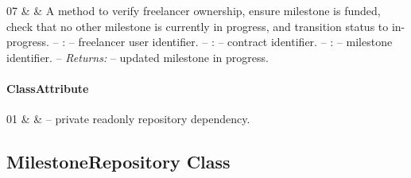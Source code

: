 \begin{ClassMethodTable}
07 & \newline{}\newline{} &
A method to verify freelancer ownership, ensure milestone is funded, check that no other milestone is currently in progress, and transition status to in-progress.
\newline -- :  -- freelancer user identifier.
\newline -- :  -- contract identifier.
\newline -- :  -- milestone identifier.
\newline -- \textit{Returns:}  -- updated milestone in progress. \\ \hline
\end{ClassMethodTable}

\paragraph{ClassAttribute}
\begin{ClassAttributeTable}
01 &  &  -- private readonly repository dependency. \\ \hline
\end{ClassAttributeTable}

\subsection{MilestoneRepository Class}

